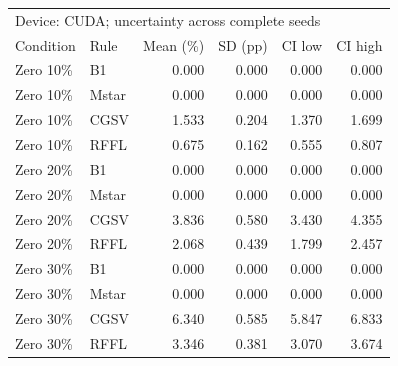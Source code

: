 \begin{tabular}{llrrrr}
\toprule
\multicolumn{6}{l}{Device: CUDA; uncertainty across complete seeds} \\
Condition & Rule & Mean (\%) & SD (pp) & CI low & CI high \\
\midrule
Zero 10\% & B1 & 0.000 & 0.000 & 0.000 & 0.000 \\
Zero 10\% & Mstar & 0.000 & 0.000 & 0.000 & 0.000 \\
Zero 10\% & CGSV & 1.533 & 0.204 & 1.370 & 1.699 \\
Zero 10\% & RFFL & 0.675 & 0.162 & 0.555 & 0.807 \\
Zero 20\% & B1 & 0.000 & 0.000 & 0.000 & 0.000 \\
Zero 20\% & Mstar & 0.000 & 0.000 & 0.000 & 0.000 \\
Zero 20\% & CGSV & 3.836 & 0.580 & 3.430 & 4.355 \\
Zero 20\% & RFFL & 2.068 & 0.439 & 1.799 & 2.457 \\
Zero 30\% & B1 & 0.000 & 0.000 & 0.000 & 0.000 \\
Zero 30\% & Mstar & 0.000 & 0.000 & 0.000 & 0.000 \\
Zero 30\% & CGSV & 6.340 & 0.585 & 5.847 & 6.833 \\
Zero 30\% & RFFL & 3.346 & 0.381 & 3.070 & 3.674 \\
\bottomrule
\end{tabular}
